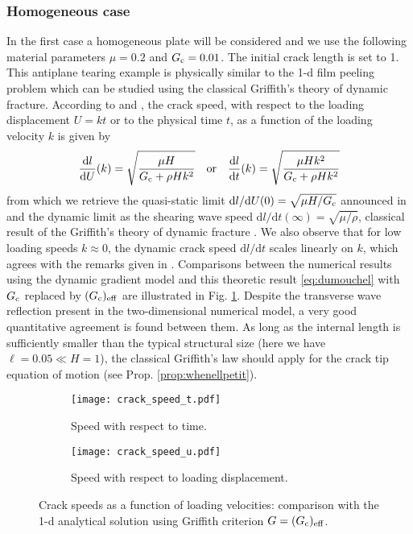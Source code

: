 \subsubsection{Homogeneous case} \label{sec:homo}
In the first case a homogeneous plate will be considered and we use the following material parameters $\mu=0.2$ and $G_\mathrm{c}=0.01$. The initial crack length is set to 1. This antiplane tearing example is physically similar to the 1-d film peeling problem which can be studied using the classical Griffith's theory of dynamic fracture. According to \cite{DumouchelMarigoCharlotte:2008} and \cite{BourdinFrancfortMarigo:2008}, the crack speed, with respect to the loading displacement $U=kt$ or to the physical time $t$, as a function of the loading velocity $k$ is given by
\begin{equation} \label{eq:dumouchel}
\frac{\mathrm{d} l}{\mathrm{d} U}(k)=\sqrt{\frac{\mu H}{G_\mathrm{c}+\rho Hk^2}}\quad\text{or}\quad\frac{\mathrm{d} l}{\mathrm{d} t}(k)=\sqrt{\frac{\mu Hk^2}{G_\mathrm{c}+\rho Hk^2}}
\end{equation}
from which we retrieve the quasi-static limit $\mathrm{d} l/\mathrm{d} U(0)=\sqrt{\mu H/G_\mathrm{c}}$ announced in \cite{BourdinFrancfortMarigo:2008} and the dynamic limit as the shearing wave speed $\mathrm{d} l/\mathrm{d} t(\infty)=\sqrt{\mu/\rho}$, classical result of the Griffith's theory of dynamic fracture \cite{Freund:1990}. We also observe that for low loading speeds $k\approx 0$, the dynamic crack speed $\mathrm{d} l/\mathrm{d} t$ scales linearly on $k$, which agrees with the remarks given in \cite{Bourdin:2011}. Comparisons between the numerical results using the dynamic gradient model and this theoretic result \eqref{eq:dumouchel} with $G_\mathrm{c}$ replaced by $(G_\mathrm{c})_\mathrm{eff}$ are illustrated in Fig. \ref{fig:mode3}. Despite the transverse wave reflection present in the two-dimensional numerical model, a very good quantitative agreement is found between them. As long as the internal length is sufficiently smaller than the typical structural size (here we have $\ell=0.05\ll H=1$), the classical Griffith's law should apply for the crack tip equation of motion (see Prop. \ref{prop:whenellpetit}).
\begin{figure}[htbp]
\centering
\begin{subfigure}[b]{0.48\textwidth}
\centering
\texttt{[image: crack\_speed\_t.pdf]}
\caption{Speed with respect to time.}
\end{subfigure}
\begin{subfigure}[b]{0.48\textwidth}
\centering
\texttt{[image: crack\_speed\_u.pdf]}
\caption{Speed with respect to loading displacement.}
\end{subfigure}
\caption{Crack speeds as a function of loading velocities: comparison with the 1-d analytical solution using Griffith criterion $G=(G_\mathrm{c})_\mathrm{eff}$.} \label{fig:mode3}
\end{figure}

